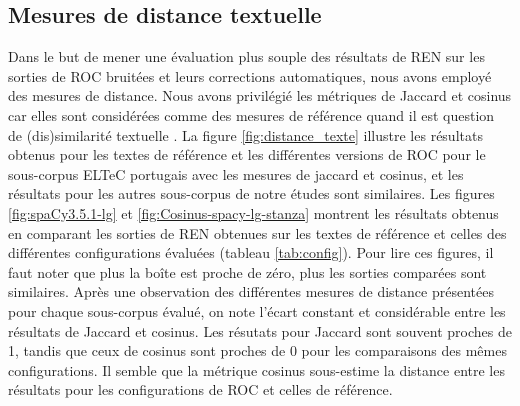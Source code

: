 \subsection{Mesures de distance textuelle}
\label{sec:distances_creux}
Dans le but de mener une évaluation plus souple des résultats de REN sur les sorties de ROC bruitées et leurs corrections automatiques, nous avons employé des mesures de distance. Nous avons privilégié les métriques de Jaccard et cosinus car elles sont considérées comme des mesures de référence quand il est question de (dis)similarité textuelle \cite{buscaldi2020calcul}. La figure \ref{fig:distance_texte} illustre les résultats obtenus pour les textes de référence et les différentes versions de ROC pour le sous-corpus ELTeC portugais avec les mesures de jaccard et cosinus, et les résultats pour les autres sous-corpus de notre études sont similaires. Les figures \ref{fig:spaCy3.5.1-lg} et \ref{fig:Cosinus-spacy-lg-stanza} montrent les résultats obtenus en comparant les sorties de REN obtenues sur les textes de référence et celles des différentes configurations évaluées (tableau \ref{tab:config}). Pour lire ces figures, il faut noter que plus la boîte est proche de zéro, plus les sorties comparées sont similaires.
Après une observation des différentes mesures de distance présentées pour chaque sous-corpus évalué, on note l'écart constant et considérable entre les résultats de Jaccard et cosinus. Les résutats pour Jaccard sont souvent proches de 1, tandis que ceux de cosinus sont proches de 0 pour les comparaisons des mêmes configurations. Il semble que la métrique cosinus sous-estime la distance entre les résultats pour les configurations de ROC et celles de référence. 

